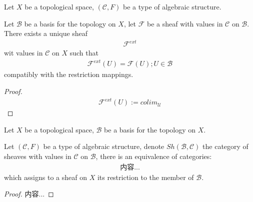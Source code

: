 \documentclass[Total.tex]{subfiles}
\begin{document}
				\begin{lemma}
					Let $X$ be a topological space, $(\mathcal{C},F)$ be a type of algebraic structure.
					
					Let $\mathcal{B}$ be a basis for the topology on $X$, let $\mathcal{F}$ be a sheaf with values in $\mathcal{C}$ on $\mathcal{B}$. There exists a unique sheaf
					\begin{gather*}
						\mathcal{F}^{ext}
					\end{gather*}
					wit values in $\mathcal{C}$ on $X$ such that
					\begin{gather*}
						\mathcal{F}^{ext}(U)=\mathcal{F}(U);U\in \mathcal{B}
					\end{gather*}
					compatibly with the restriction mappings.
				\end{lemma}
				\begin{proof}
					\begin{gather*}
						\mathcal{F}^{ext}(U):=colim_\mathcal{U} 
					\end{gather*}
				\end{proof}
				
				\begin{lemma}
					Let $X$ be a topological space, $\mathcal{B}$ be a basis for the topology on $X$.
					
					Let $(\mathcal{C},F)$ be a type of algebraic structure, denote $Sh(\mathcal{B},\mathcal{C})$ the category of sheaves with values in $\mathcal{C}$ on $\mathcal{B}$, there is an equivalence of categories:
					\begin{gather*}
						内容...
					\end{gather*}
					which assigns to a sheaf on $X$ its restriction to the member of $\mathcal{B}$.
				\end{lemma}
				\begin{proof}
					内容...
				\end{proof}
\end{document}
